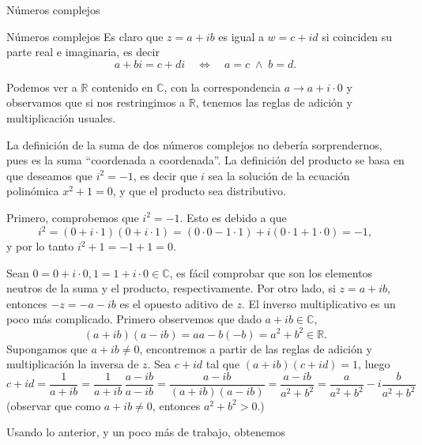 \documentclass[a4paper,12pt,twoside,spanish,reqno]{amsbook}
\theoremstyle{definition}
\theoremstyle{remark}
\newcommand{\R}{\mathbb R}
\newcommand{\C}{\mathbb C}
\begin{document}
\begin{chapter}{Números complejos}
\begin{section}{Números complejos}
        Es claro  que $z=a+ib$ es igual a $w = c+id$ si coinciden su parte real e imaginaria, es decir
        \begin{equation*}
        a+ bi = c+ di\quad \Leftrightarrow\quad a=c \;\wedge\; b = d.
        \end{equation*}
        
        Podemos  ver a $\R$ contenido en $\C$,  con la correspondencia $a \to a + i \cdot 0$ y  observamos que si  nos restringimos a $\R$, tenemos las reglas de adición y  multiplicación usuales.  
        
        La definición de la suma de dos números complejos no debería sorprendernos, pues es la suma ``coordenada a coordenada''. La definición del producto se basa en que deseamos que $i^2 = -1$,  es decir que $i$  sea la solución de la ecuación polinómica $x^2 + 1 =0$,   y que el producto sea distributivo. 	
        
        Primero, comprobemos que  $i^2 = -1$. Esto es debido a que
        \begin{equation*}
        i^2 = (0 + i\cdot 1)(0 + i\cdot 1) = (0\cdot 0 - 1 \cdot 1) + i(0\cdot 1 + 1 \cdot 0) = -1,
        \end{equation*} 
        y por lo tanto $i^2 + 1 = -1+1 = 0$.  
        
        
        Sean $0 = 0 + i\cdot 0, 1 = 1 + i\cdot 0 \in \C$,  es fácil comprobar que son los elementos neutros de la suma y el producto,  respectivamente. Por otro lado, si $z = a + ib$,  entonces $-z = -a -ib$ es el opuesto aditivo de $z$. 
        El inverso multiplicativo es un poco más complicado. Primero observemos que dado $a+ib \in \C$,
        \begin{equation*}
        (a+ ib)(a-ib) = aa -b(-b) = a^2 + b^2 \in \R. 
        \end{equation*}
        Supongamos que $a+ib\ne0$,  encontremos  a partir  de las reglas de adición y multiplicación la inversa de $z$. Sea $c+id$ tal que $(a+ib)(c+id)=1$, luego
        \begin{equation*}
        c + id = \frac{1}{a+ib} = \frac{1}{a+ib}\,\frac{a-ib}{a-ib} = \frac{a-ib}{(a+ib)(a-ib)} = 
        \frac{a-ib}{ a^2 + b^2} = \frac{a}{ a^2 + b^2} - i\frac{b}{ a^2 + b^2}
        \end{equation*}  
        (observar que como $a+ib\ne0$,  entonces $a^2 + b^2 >0$.)
        
        Usando lo anterior,  y un poco más de trabajo, obtenemos
        

\end{section}
\end{chapter}
\end{document}
